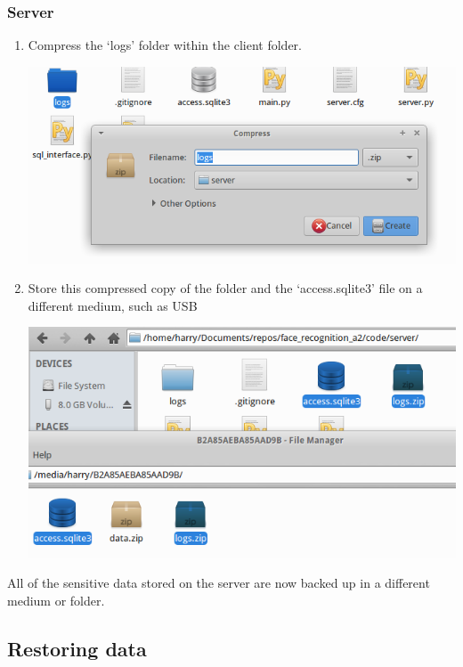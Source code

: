 \documentclass[a4paper]{article}
\begin{document}
        \subsubsection{Server}
            \begin{enumerate}
                \item Compress the `logs' folder within the client folder.
                \begin{center}
                \includegraphics[scale=0.4]{../shared_assets/screenshots/manual/compressserverdata.png}
                \end{center}
                \item Store this compressed copy of the folder and the `access.sqlite3' file on a different medium, such as USB
                \begin{center}
                \includegraphics[scale=0.4]{../shared_assets/screenshots/manual/serverstoredusb.png}
                \end{center}
            \end{enumerate}
            All of the sensitive data stored on the server are now backed up in a different medium or folder.

    \subsection{Restoring data}
\end{document}
